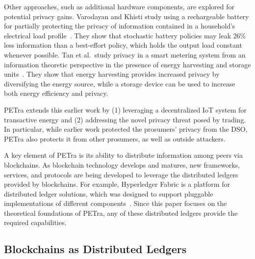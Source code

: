 Other approaches, such as additional hardware components, are explored
for potential privacy gains. Varodayan and Khisti study using a
rechargeable battery for partially protecting the privacy of
information contained in a household's electrical load
profile~\cite{varodayan2011smart}. They show that stochastic battery
policies may leak 26\% less information than a best-effort policy,
which holds the output load constant whenever possible. Tan et
al.\ study privacy in a smart metering system from an information
theoretic perspective in the presence of energy harvesting and storage
units~\cite{tan2013increasing}. They show that energy harvesting
provides increased privacy by diversifying the energy source, while a
storage device can be used to increase both energy efficiency and
privacy.

PETra extends this earlier work by (1) leveraging a decentralized IoT
system for transactive energy and (2) addressing the novel privacy
threat posed by trading. In particular, while earlier work protected
the prosumers' privacy from the DSO, PETra also protects it from other
prosumers, as well as outside attackers.

A key element of PETra is its ability to distribute information among
peers via blockchains.  As blockchain technology develops and matures,
new frameworks, services, and protocols are being developed to
leverage the distributed ledgers provided by blockchains. For example,
Hyperledger Fabric is a platform for distributed ledger solutions,
which was designed to support pluggable implementations of different
components~\cite{hyperledger2017fabric}.
Since this paper focuses on the theoretical foundations of PETra, any
of these distributed ledgers provide the required capabilities.


\iffalse
\subsection{Blockchains as Distributed Ledgers}

